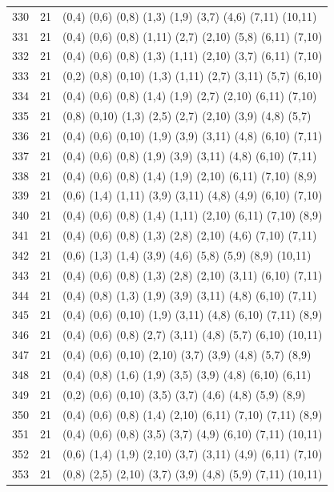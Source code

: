 {\begin{longtable}{lll}
330 & 21 & (0,4) (0,6) (0,8) (1,3) (1,9) (3,7) (4,6) (7,11) (10,11) \\
331 & 21 & (0,4) (0,6) (0,8) (1,11) (2,7) (2,10) (5,8) (6,11) (7,10) \\
332 & 21 & (0,4) (0,6) (0,8) (1,3) (1,11) (2,10) (3,7) (6,11) (7,10) \\
333 & 21 & (0,2) (0,8) (0,10) (1,3) (1,11) (2,7) (3,11) (5,7) (6,10) \\
334 & 21 & (0,4) (0,6) (0,8) (1,4) (1,9) (2,7) (2,10) (6,11) (7,10) \\
335 & 21 & (0,8) (0,10) (1,3) (2,5) (2,7) (2,10) (3,9) (4,8) (5,7) \\
336 & 21 & (0,4) (0,6) (0,10) (1,9) (3,9) (3,11) (4,8) (6,10) (7,11) \\
337 & 21 & (0,4) (0,6) (0,8) (1,9) (3,9) (3,11) (4,8) (6,10) (7,11) \\
338 & 21 & (0,4) (0,6) (0,8) (1,4) (1,9) (2,10) (6,11) (7,10) (8,9) \\
339 & 21 & (0,6) (1,4) (1,11) (3,9) (3,11) (4,8) (4,9) (6,10) (7,10) \\
340 & 21 & (0,4) (0,6) (0,8) (1,4) (1,11) (2,10) (6,11) (7,10) (8,9) \\
341 & 21 & (0,4) (0,6) (0,8) (1,3) (2,8) (2,10) (4,6) (7,10) (7,11) \\
342 & 21 & (0,6) (1,3) (1,4) (3,9) (4,6) (5,8) (5,9) (8,9) (10,11) \\
343 & 21 & (0,4) (0,6) (0,8) (1,3) (2,8) (2,10) (3,11) (6,10) (7,11) \\
344 & 21 & (0,4) (0,8) (1,3) (1,9) (3,9) (3,11) (4,8) (6,10) (7,11) \\
345 & 21 & (0,4) (0,6) (0,10) (1,9) (3,11) (4,8) (6,10) (7,11) (8,9) \\
346 & 21 & (0,4) (0,6) (0,8) (2,7) (3,11) (4,8) (5,7) (6,10) (10,11) \\
347 & 21 & (0,4) (0,6) (0,10) (2,10) (3,7) (3,9) (4,8) (5,7) (8,9) \\
348 & 21 & (0,4) (0,8) (1,6) (1,9) (3,5) (3,9) (4,8) (6,10) (6,11) \\
349 & 21 & (0,2) (0,6) (0,10) (3,5) (3,7) (4,6) (4,8) (5,9) (8,9) \\
350 & 21 & (0,4) (0,6) (0,8) (1,4) (2,10) (6,11) (7,10) (7,11) (8,9) \\
351 & 21 & (0,4) (0,6) (0,8) (3,5) (3,7) (4,9) (6,10) (7,11) (10,11) \\
352 & 21 & (0,6) (1,4) (1,9) (2,10) (3,7) (3,11) (4,9) (6,11) (7,10) \\
353 & 21 & (0,8) (2,5) (2,10) (3,7) (3,9) (4,8) (5,9) (7,11) (10,11) \\

\end{longtable}}

